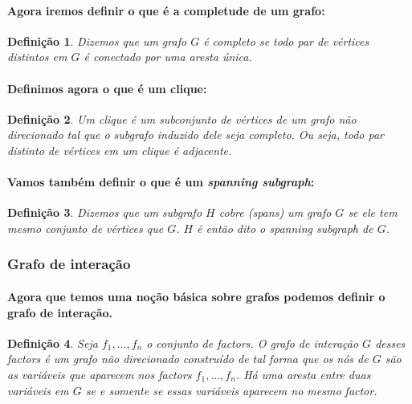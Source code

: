 \documentclass[a4paper,10pt]{article}
\theoremstyle{plain}
\newtheorem*{spn-def}{Definição}
\begin{document}
\paragraph{
  Agora iremos definir o que é a completude de um grafo:
}

\begin{spn-def} Dizemos que um grafo $G$ é completo se todo par de vértices distintos em $G$ é 
  conectado por uma aresta única.
\end{spn-def}

\paragraph{
  Definimos agora o que é um clique:
}

\begin{spn-def} Um clique é um subconjunto de vértices de um grafo não direcionado tal que o 
  subgrafo induzido dele seja completo. Ou seja, todo par distinto de vértices em um clique é 
  adjacente.
\end{spn-def}

\paragraph{
  Vamos também definir o que é um \textit{spanning subgraph}:
}

\begin{spn-def} Dizemos que um subgrafo $H$ cobre (\textit{spans}) um grafo $G$ se ele tem mesmo
  conjunto de vértices que $G$. $H$ é então dito o \textit{spanning subgraph} de $G$.
\end{spn-def}

\subsubsection{Grafo de interação}

\paragraph{
  Agora que temos uma noção básica sobre grafos podemos definir o grafo de interação.
}

\begin{spn-def} Seja $f_1,...,f_n$ o conjunto de factors. O \textit{grafo de interação} $G$ desses
  factors é um grafo não direcionado construído de tal forma que os nós de $G$ são as variáveis que
  aparecem nos factors $f_1,...,f_n$. Há uma aresta entre duas variáveis em $G$ se e somente se 
  essas variáveis aparecem no mesmo factor.
\end{spn-def}
\end{document}
